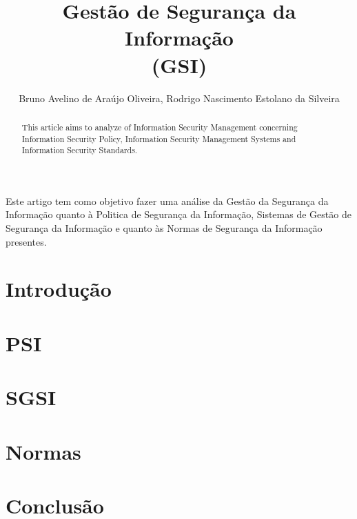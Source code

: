 \documentclass[12pt]{article}
\title{Gestão de Segurança da Informação \\
(GSI)}
\author{Bruno Avelino de Araújo Oliveira, Rodrigo Nascimento Estolano da Silveira }
\begin{document}
 

\maketitle

\begin{abstract}
    This article aims to analyze of Information Security Management concerning Information Security Policy, Information Security Management Systems and Information Security Standards.
\end{abstract}
     
\begin{resumo} 
Este artigo tem como objetivo fazer uma análise da
Gestão da Segurança da Informação quanto à Politica de Segurança da Informação, Sistemas de Gestão de Segurança da Informação e quanto às Normas de Segurança da Informação presentes.


\end{resumo}

\section{Introdução}

\section{PSI}

\section{SGSI}


\section{Normas}

\section{Conclusão}


\newpage



\end{document}
